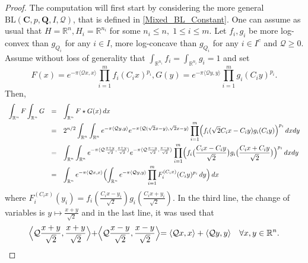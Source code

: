 \documentclass[11pt,a4paper,reqno]{amsart}
\numberwithin{equation}{section}
\theoremstyle{definition}
\newcommand{\nm}{\noalign{\smallskip}}
\newcommand{\ds}{\displaystyle}
\newcommand{\<}{\ensuremath \leq}
\renewcommand{\>}{\ensuremath \geq}
\begin{document}
\begin{proof}
The computation will first start by considering the more general $\mathrm{BL}(\textbf{C},p,\textbf{Q},I,\mathcal{Q})$, that is defined in \cref{Mixed_BL_Constant}. One can assume as usual that $H=\mathbb{R}^n, H_i=\mathbb{R}^{n_i}$ for some $n_i \leq n, \; 1 \leq i \leq m.$ Let $f_i, g_i$ be more log-convex than $g_{Q_i}$ for any $i \in I$, more log-concave than $g_{Q_i}$ for any $i \in I^c$ and $\mathcal{Q} \geq 0.$ Assume without loss of generality that $\int_{\mathbb{R}^{n_i}}f_i=\int_{\mathbb{R}^{n_i}}g_i=1$ and set $$F(x)=e^{-\pi \langle \mathcal{Q}x,x\rangle}\prod_{i=1}^m f_i(C_ix)^{p_i}, G(y)=e^{-\pi \langle \mathcal Qy,y \rangle}\prod_{i=1}^m g_i(C_iy)^{p_i}.$$ Then, \begin{equation} \label{Ext_implies_Gaussianext_eq}\begin{array}{lll}
\ds \int_{\mathbb{R}^n}F \int_{\mathbb{R}^n}G &=& \ds \int_{\mathbb{R}^n}F \star G(x)\, dx \\
\nm 
&=& \ds 2^{n/2} \int_{\mathbb{R}^n}\int_{\mathbb{R}^n} e^{-\pi \langle \mathcal{Q}y,y\rangle} e^{-\pi \langle \mathcal Q(\sqrt{2}x-y),\sqrt{2}x-y\rangle} \prod_{i=1}^m \Bigl(f_i(\sqrt{2}C_ix-C_iy)g_i(C_iy)\Bigl)^{p_i} \, dx dy \\
\nm 
&=& \ds \int_{\mathbb{R}^n} \int_{\mathbb{R}^n} e^{-\pi \langle \mathcal Q \frac{x+y}{\sqrt{2}},\frac{x+y}{\sqrt{2}}\rangle}e^{-\pi \langle \mathcal Q \frac{x-y}{\sqrt{2}},\frac{x-y}{\sqrt{2}} \rangle} \prod_{i=1}^m \Bigl(f_i \bigl(\frac{C_ix-C_iy}{\sqrt{2}} \bigl)g_i \bigl(\frac{C_ix+C_iy}{\sqrt{2}} \bigl)\Bigl)^{p_i} \, dx dy \\
\nm 
&=& \ds \int_{\mathbb{R}^n} e^{-\pi \langle \mathcal Qx,x \rangle} \Bigl( \int_{\mathbb{R}^n} e^{-\pi \langle \mathcal Qy,y \rangle} \prod_{i=1}^m F_i^{(C_ix)}(C_iy)^{p_i} \, dy \Bigl) \, dx
\end{array}\end{equation} where $F_i^{(C_ix)}(y_i)=f_i(\frac{C_ix-y_i}{\sqrt{2}})g_i(\frac{C_ix+y_i}{\sqrt{2}}).$
In the third line, the change of variables is $y \mapsto \frac{x+y}{\sqrt 2}$ and in the last line, it was used that $$\Bigl \langle \mathcal Q\frac{x+y}{\sqrt{2}},\frac{x+y}{\sqrt 2}\Bigl \rangle+\Bigl \langle \mathcal Q\frac{x-y}{\sqrt{2}},\frac{x-y}{\sqrt 2}\Bigl \rangle=\langle \mathcal Qx,x\rangle+\langle \mathcal Qy,y\rangle \quad \forall x,y \in \mathbb{R}^n.$$



\end{proof}
\end{document}
